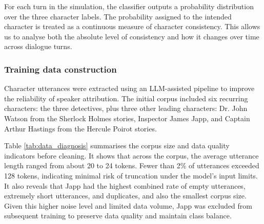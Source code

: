 \documentclass{article}
\begin{document}
For each turn in the simulation, the classifier outputs a probability distribution over the three character labels. The probability assigned to the intended character is treated as a continuous measure of character consistency. This allows us to analyse both the absolute level of consistency and how it changes over time across dialogue turns.

\subsubsection{Training data construction} \label{sec:eval_baseline_data}

Character utterances were extracted using an LLM-assisted pipeline to improve the reliability of speaker attribution. The initial corpus included six recurring characters: the three detectives, plus three other leading characters: Dr. John Watson from the Sherlock Holmes stories, Inspector James Japp, and Captain Arthur Hastings from the Hercule Poirot stories. 

Table \ref{tab:data_diagnosis} summarises the corpus size and data quality indicators before cleaning. It shows that across the corpus, the average utterance length ranged from about 20 to 24 tokens. Fewer than 2\% of utterances exceeded 128 tokens, indicating minimal risk of truncation under the model's input limits. It also reveals that Japp had the highest combined rate of empty utterances, extremely short utterances, and duplicates, and also the smallest corpus size. Given this higher noise level and limited data volume, Japp was excluded from subsequent training to preserve data quality and maintain class balance.
\begin{table}[h]
    \centering
\caption{Initial Corpus Statistics and Data Quality Diagnostics (\% of Utterances).}
\label{tab:data_diagnosis}
\end{table}
\end{document}

